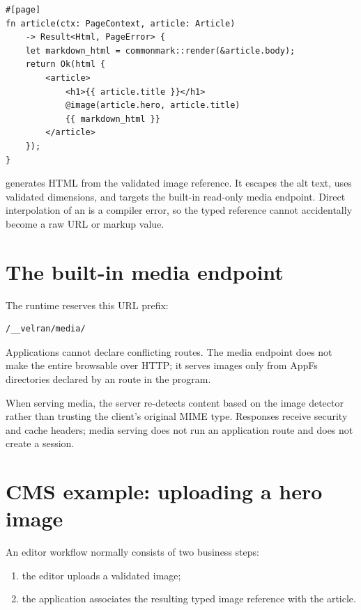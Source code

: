 \begin{lstlisting}[language=Velran]
#[page]
fn article(ctx: PageContext, article: Article)
    -> Result<Html, PageError> {
    let markdown_html = commonmark::render(&article.body);
    return Ok(html {
        <article>
            <h1>{{ article.title }}</h1>
            @image(article.hero, article.title)
            {{ markdown_html }}
        </article>
    });
}
\end{lstlisting}

 generates HTML from the validated image reference. It escapes the alt text, uses validated dimensions, and targets the built-in read-only media endpoint. Direct  interpolation of an  is a compiler error, so the typed reference cannot accidentally become a raw URL or markup value.

\section{The built-in media endpoint}

The runtime reserves this URL prefix:

\begin{lstlisting}
/__velran/media/
\end{lstlisting}

Applications cannot declare conflicting routes. The media endpoint does not make the entire  browsable over HTTP; it serves images only from AppFs directories declared by an  route in the program.

When serving media, the server re-detects content based on the image detector rather than trusting the client's original MIME type. Responses receive security and cache headers; media serving does not run an application route and does not create a session.

\section{CMS example: uploading a hero image}

An editor workflow normally consists of two business steps:

\begin{enumerate}
  \item the editor uploads a validated image;
  \item the application associates the resulting typed image reference with the article.
\end{enumerate}

